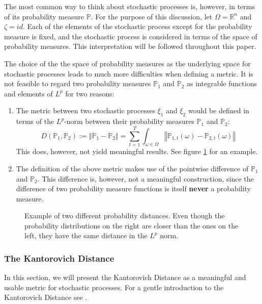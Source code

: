 \documentclass[a4paper, 12pt] {article}
\begin{document}
The most common way to think about stochastic processes is, however, in terms of its probability measure $\mathbb{P}$.
For the purpose of this discussion, let $\Omega=\mathbb{R}^n$ and $\zeta=id$.
Each of the elements of the stochastic process except for the probability measure is fixed, and the stochastic process is considered in terms of the space of probability measures.
This interpretation will be followed throughout this paper.

The choice of the the space of probability measures as the underlying space for stochastic processes leads to much more difficulties when defining a metric. It is not feasible to regard two probability measures $\mathbb{P}_1$ and $\mathbb{P}_2$ as integrable functions and elements of $L^p$ for two reasons:
\begin{enumerate}
\item The metric between two stochastic processes $\xi_1$ and $\xi_2$ would be defined in terms of the $L^p$-norm between their probability measures $\mathbb{P}_1$ and $\mathbb{P}_2$:
  \begin{equation}
    \label{eq:prob-measure-metric-as-Lpnorm}
    D(\mathbb{P}_1,\mathbb{P}_2) := \left\Vert \mathbb{P}_1-\mathbb{P}_2\right\Vert = \sum_{t=1}^T\int_{\omega\in\Omega}\left\Vert \mathbb{P}_{1,t}(\omega)-\mathbb{P}_{2,t}(\omega)\right\Vert
  \end{equation}
  This does, however, not yield meaningful results. See figure \ref{fig:example-wrong-distance} for an example.
\item The definition of the above metric makes use of the pointwise difference of $\mathbb{P}_1$ and $\mathbb{P}_2$. 
  This difference is, however, not a meaningful construction, since the difference of two probability measure functions is itself \textbf{never} a probability measure.
\end{enumerate}
\begin{figure}
  \centering
  \caption{Example of two different probability distances. 
    Even though the probability distributions on the right are closer than the ones on the left, they have the same distance in the $L^p$ norm.}
  \label{fig:example-wrong-distance}
\end{figure}
\subsubsection{The Kantorovich Distance}
In this section, we will present the Kantorovich Distance as a meaningful and usable metric for stochastic processes. For a gentle introduction to the Kantorovich Distance see \cite{Deng2009}.
\end{document}
